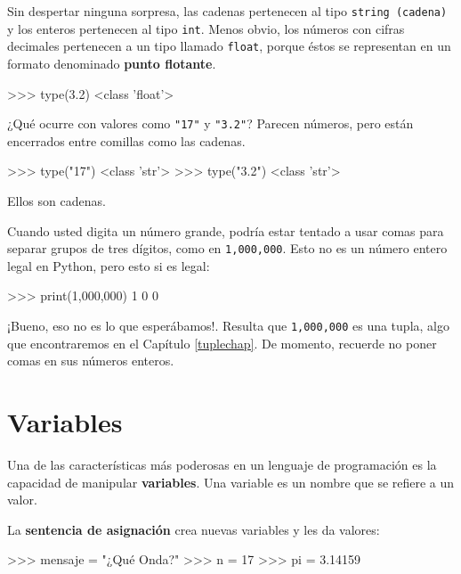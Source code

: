 Sin despertar ninguna sorpresa, las cadenas pertenecen al tipo \texttt{string
(cadena)} y los enteros pertenecen al tipo \texttt{int}. Menos obvio, los
números con cifras decimales pertenecen a un tipo llamado \texttt{float},
porque éstos se representan en un formato denominado {\bf punto flotante}.


\beforeverb
\begin{pyconcode}
>>> type(3.2)
<class 'float'>
\end{pyconcode}
\afterverb
%

¿Qué ocurre con valores como {\verb+"17"+} y {\verb+"3.2"+}?
Parecen números, pero están encerrados entre comillas como las cadenas.

\beforeverb
\begin{pyconcode}
>>> type("17")
<class 'str'>
>>> type("3.2")
<class 'str'>
\end{pyconcode}
\afterverb
%

Ellos son cadenas.

Cuando usted digita un número grande, podría estar tentado a usar
comas para separar grupos de tres dígitos, como en \texttt{1,000,000}.  
Esto no es un número entero legal en Python, pero esto si es legal:

\beforeverb
\begin{pyconcode}
>>> print(1,000,000)
1 0 0
\end{pyconcode}
\afterverb
%

¡Bueno, eso no es lo que esperábamos!.  Resulta que  {\tt 1,000,000} es una 
tupla, algo que encontraremos en el Capítulo \ref{tuplechap}.  De momento, 
recuerde no poner comas en sus números enteros.


\section{Variables}

Una de las características más poderosas en un lenguaje de programación
es la capacidad de manipular {\bf variables}. Una variable es un nombre
que se refiere a un valor.

La {\bf sentencia de asignación} crea nuevas variables y les da valores:

\beforeverb
\begin{pyconcode}
>>> mensaje = "¿Qué Onda?"
>>> n = 17
>>> pi = 3.14159
\end{pyconcode}
\afterverb
%

